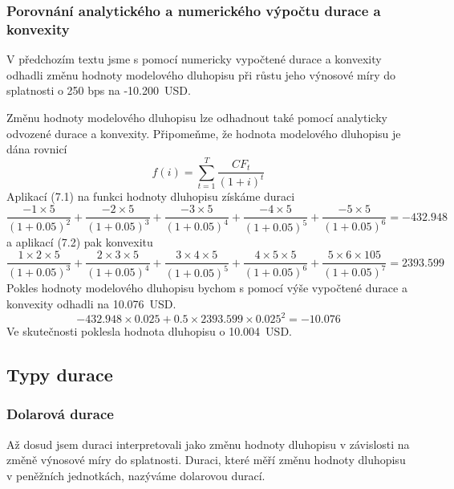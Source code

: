 \documentclass[a4paper]{book}
\begin{document}
\subsubsection{Porovnání analytického a numerického výpočtu durace a konvexity}

V předchozím textu jsme s pomocí numericky vypočtené durace a konvexity odhadli změnu hodnoty modelového dluhopisu při růstu jeho výnosové míry do splatnosti o 250 bps na -10.200~USD.

Změnu hodnoty modelového dluhopisu lze odhadnout také pomocí analyticky odvozené durace a konvexity. Připomeňme, že hodnota modelového dluhopisu je dána rovnicí
\begin{equation*}
f(i) = \sum_{t = 1}^T \frac{CF_t}{(1+i)^t}
\end{equation*}
Aplikací (7.1) na funkci hodnoty dluhopisu získáme duraci
\begin{equation*}
\frac{-1 \times 5}{(1+0.05)^2} +  \frac{-2 \times 5}{(1+0.05)^3} +  \frac{-3 \times 5}{(1+0.05)^4} +  \frac{-4 \times 5}{(1+0.05)^5} +  \frac{-5 \times 5}{(1+0.05)^6} = -432.948
\end{equation*}
a aplikací (7.2) pak konvexitu
\begin{equation*}
\frac{1 \times 2 \times 5}{(1+0.05)^3} + \frac{2 \times 3 \times 5}{(1+0.05)^4} + \frac{3 \times 4 \times 5}{(1+0.05)^5} + \frac{4 \times 5 \times 5}{(1+0.05)^6} + \frac{5 \times 6 \times 105}{(1+0.05)^7} = 2393.599
\end{equation*}
Pokles hodnoty modelového dluhopisu bychom s pomocí výše vypočtené durace a konvexity odhadli na 10.076~USD.
\begin{equation*}
-432.948 \times 0.025 + 0.5 \times 2393.599 \times 0.025^2 = -10.076
\end{equation*}
Ve skutečnosti poklesla hodnota dluhopisu o 10.004~USD.

\subsection{Typy durace}

\subsubsection{Dolarová durace}

Až dosud jsem duraci interpretovali jako změnu hodnoty dluhopisu v závislosti na změně výnosové míry do splatnosti. Duraci, které měří změnu hodnoty dluhopisu v peněžních jednotkách, nazýváme dolarovou durací.
\end{document}
